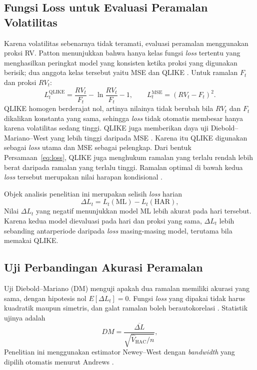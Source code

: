 \subsection{Fungsi Loss untuk Evaluasi Peramalan Volatilitas}
Karena volatilitas sebenarnya tidak teramati, evaluasi peramalan menggunakan
proksi RV. Patton menunjukkan bahwa hanya kelas fungsi \textit{loss} tertentu
yang menghasilkan peringkat model yang konsisten ketika proksi yang digunakan
berisik; dua anggota kelas tersebut yaitu MSE dan QLIKE \cite{patton2011}.
Untuk ramalan $F_t$ dan proksi $RV_t$:
\begin{equation}
  L^{\text{QLIKE}}_t = \frac{RV_t}{F_t} - \ln\frac{RV_t}{F_t} - 1,
  \qquad
  L^{\text{MSE}}_t = (RV_t - F_t)^2.
  \label{eq:loss}
\end{equation}
QLIKE homogen berderajat nol, artinya nilainya tidak berubah bila $RV_t$ dan
$F_t$ dikalikan konstanta yang sama, sehingga \textit{loss} tidak otomatis
membesar hanya karena volatilitas sedang tinggi. QLIKE juga memberikan daya uji
Diebold--Mariano--West yang lebih tinggi daripada MSE \cite{patton2011}.
Karena itu QLIKE digunakan sebagai \textit{loss} utama dan MSE sebagai
pelengkap. Dari bentuk Persamaan~\eqref{eq:loss}, QLIKE juga menghukum
ramalan yang terlalu rendah lebih berat daripada ramalan yang terlalu tinggi.
Ramalan optimal di bawah kedua \textit{loss} tersebut merupakan nilai harapan
kondisional \cite{patton2011}.

Objek analisis penelitian ini merupakan selisih \textit{loss} harian
\begin{equation}
  \Delta L_t = L_t(\text{ML}) - L_t(\text{HAR}),
  \label{eq:delta-loss}
\end{equation}
Nilai $\Delta L_t$ yang negatif menunjukkan model ML lebih akurat pada hari
tersebut.
Karena kedua model dievaluasi pada hari dan proksi yang sama, $\Delta L_t$
lebih sebanding antarperiode daripada \textit{loss} masing-masing model,
terutama bila memakai QLIKE.

\subsection{Uji Perbandingan Akurasi Peramalan}
Uji Diebold--Mariano (DM) menguji apakah dua ramalan memiliki akurasi yang
sama, dengan hipotesis nol $E[\Delta L_t] = 0$. Fungsi \textit{loss} yang
dipakai tidak harus kuadratik maupun simetris, dan galat ramalan boleh
berautokorelasi \cite{diebold1995}. Statistik ujinya adalah
\begin{equation}
  DM = \frac{\overline{\Delta L}}{\sqrt{\widehat{V}_{\text{HAC}} / n}},
  \label{eq:dm}
\end{equation}
Penelitian ini menggunakan estimator Newey--West \cite{newey1987} dengan \textit{bandwidth}
yang dipilih otomatis menurut Andrews \cite{andrews1991}.

